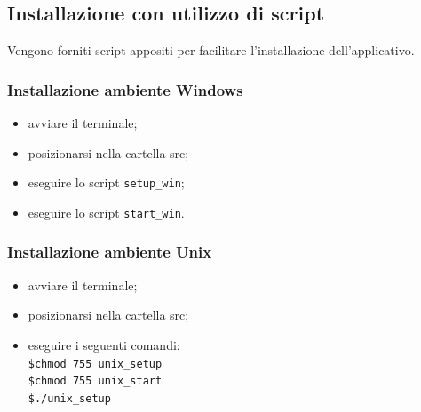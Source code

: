 \documentclass[12pt,a4paper]{article}
\begin{document}
	\subsection{Installazione con utilizzo di script}
	Vengono forniti script appositi per facilitare l'installazione dell'applicativo. 
	
		\subsubsection{Installazione ambiente Windows}
		\begin{itemize}
			\item avviare il terminale;
			\item posizionarsi nella cartella src;
			\item eseguire lo script \texttt{setup\_win};
			\item eseguire lo script \texttt{start\_win}.	
		\end{itemize}	
	
		\subsubsection{Installazione ambiente Unix}
		\begin{itemize}
			\item avviare il terminale;
			\item posizionarsi nella cartella src;
			\item eseguire i seguenti comandi:\\
			\texttt{\$chmod 755 unix\_setup \\
			\$chmod 755 unix\_start	 \\
			\$./unix\_setup }
		\end{itemize}
\end{document}
